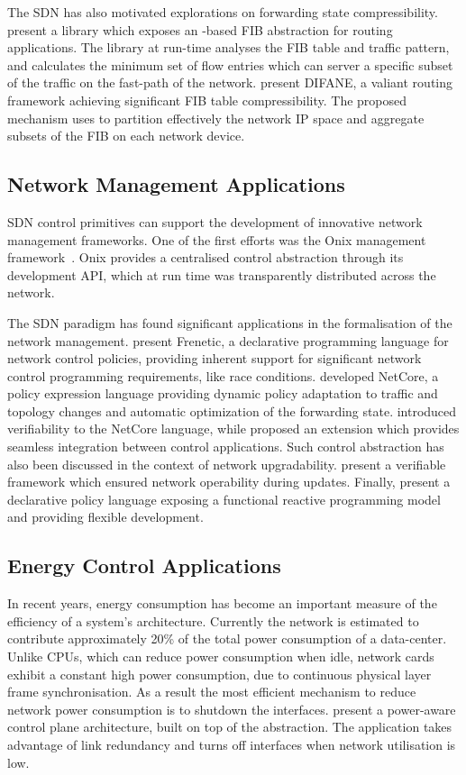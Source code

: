 The SDN has also motivated explorations on forwarding state compressibility.
 present a library which exposes an \of-based FIB abstraction
for routing applications.  The library at run-time analyses the FIB table and
traffic pattern, and calculates the minimum set of flow entries which can
server a specific subset of the traffic on the fast-path of the network.
 present DIFANE, a valiant routing framework achieving significant
FIB table compressibility.  The proposed mechanism uses \of to
partition effectively the network IP space and aggregate subsets of the FIB on
each network device. 

\subsection{Network Management Applications}

SDN control primitives can support the development of innovative network
management frameworks. One of the first efforts was the Onix management
framework~. Onix provides a centralised control abstraction
through its development API, which at run time was transparently distributed
across the network. 

The SDN paradigm has found significant applications in the formalisation of the
network management.  present Frenetic, a declarative
programming language for network control policies, providing inherent support for
significant network control programming requirements, like race conditions.
 developed NetCore, a policy expression language providing
dynamic policy adaptation to traffic and topology changes and automatic
optimization of the forwarding state.  introduced verifiability to
the NetCore language, while  proposed an extension which
provides seamless integration between control applications. Such control
abstraction has also been discussed in the context of network upgradability.
 present a verifiable framework which ensured network
operability during updates. Finally,  present a declarative
policy language exposing a functional reactive programming model and providing
flexible development.

\subsection{Energy Control Applications}

In recent years, energy consumption has become an important measure of
the efficiency of a system's architecture. Currently the network is estimated to
contribute approximately 20\% of the total power consumption of a data-center.
Unlike CPUs, which can reduce power consumption when idle, network cards exhibit
a constant high power consumption, due to continuous physical layer frame
synchronisation. As a result the most efficient mechanism to reduce network
power consumption is to shutdown the interfaces.   present a
power-aware control plane architecture, built on top of the \of abstraction. The
application takes advantage of link redundancy and turns off interfaces when
network utilisation is low. 

